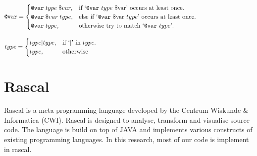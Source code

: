\documentclass[../main.tex]{subfiles}
\begin{document}
\begin{equation}
  \begin{aligned}
  \texttt{@var}=\begin{cases}
    \texttt{@var} \; type \; \$var, & \text{if `\texttt{@var} $type$ \$var' occurs at least once}.\\
    \texttt{@var} \; \$var \; type, & \text{else if `\texttt{@var} \$var $type$' occurs at least once}.\\
    \texttt{@var} \; type, & \text{otherwise try to match `\texttt{@var} $type$'}.\\
  \end{cases}
  \end{aligned}
  \phantom{\hspace{3.2cm}} %
\end{equation}

\begin{equation}
  \begin{aligned}
  type=\begin{cases}
    type|type, & \text{if `$\vert$' in $type$}.\\
    type, & \text{otherwise}
  \end{cases}
  \end{aligned}
  \phantom{\hspace{8.8cm}} %
\end{equation}
 
    \section{Rascal}
    \Gls{Rascal} is a meta programming language developed by the Centrum Wiskunde \& Informatica (CWI)\cite{Kli:09}.
    Rascal is designed to analyse, transform and visualise source code.
    The language is build on top of JAVA and implements various constructs of existing programming languages.
    In this research, most of our code is implement in rascal.
\end{document}

